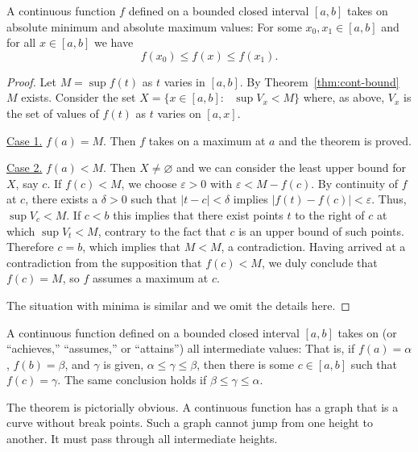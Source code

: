 \begin{thm}
  \label{thm:EVT}
  A continuous function $f$ defined on a bounded closed interval $[a,b]$ takes on absolute minimum and absolute maximum values: For some $x_0,x_1\in[a,b]$ and for all $x\in[a,b]$ we have
  \[
    f(x_0) \leqslant f(x) \leqslant f(x_1).
  \]
\end{thm}

\begin{proof}
  Let $M = \sup f(t)$ as $t$ varies in $[a,b]$.
  By Theorem~\ref{thm:cont-bound} $M$ exists.
  Consider the set $X = \{ x \in [a,b] \colon \text{ $\sup V_x < M$} \}$ where, as above, $V_x$ is the set of values of $f(t)$ as $t$ varies on $[a,x]$.

  \noindent\underline{Case 1.} $f(a) = M$.  Then $f$ takes on a maximum at $a$ and the theorem is proved.

  \noindent\underline{Case 2.} $f(a) < M$.  Then $X \ne \varnothing$ and we can consider the least upper bound for $X$, say $c$.
  If $f(c) < M$, we choose $\varepsilon > 0$ with $\varepsilon < M - f(c)$.
  By continuity of $f$ at $c$, there exists a $\delta > 0$ such that $|t - c| < \delta$ implies $|f(t) - f(c)| < \varepsilon$.
  Thus, $\sup V_c < M$.
  If $c < b$ this implies that there exist points $t$ to the right of $c$ at which $\sup V_t < M$, contrary to the fact that $c$ is an upper bound of such points.
  Therefore $c = b$, which implies that $M < M$, a contradiction.
  Having arrived at a contradiction from the supposition that $f(c) < M$, we duly conclude that $f(c) = M$, so $f$ assumes a maximum at $c$.

  The situation with minima is similar and we omit the details here.
\end{proof}

\begin{thm}
  \label{thm:IVT}
  A continuous function defined on a bounded closed interval $[a,b]$ takes on (or ``achieves,'' ``assumes,'' or ``attains'') all intermediate values: That is, if $f(a) = \alpha$, $f(b) = \beta$, and $\gamma$ is given, $\alpha \leqslant \gamma \leqslant \beta$, then there is some $c \in [a,b]$ such that $f(c) = \gamma$.
  The same conclusion holds if $\beta \leqslant \gamma \leqslant \alpha$.
\end{thm}  

The theorem is pictorially obvious.
A continuous function has a graph that is a curve without break points.
Such a graph cannot jump from one height to another.
It must pass through all intermediate heights.

